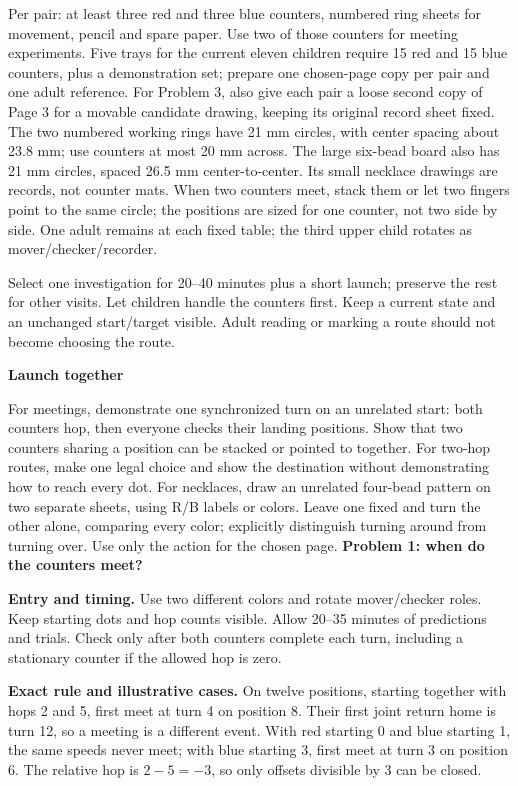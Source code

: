 \documentclass[11pt]{article}
\newcommand\lead[1]{\textbf{#1}\par}
\begin{document}
Per pair: at least three red and three blue counters, numbered ring sheets for movement, pencil and spare paper. Use two of those counters for meeting experiments. Five trays for the current eleven children require 15 red and 15 blue counters, plus a demonstration set; prepare one chosen-page copy per pair and one adult reference. For Problem 3, also give each pair a loose second copy of Page 3 for a movable candidate drawing, keeping its original record sheet fixed. The two numbered working rings have 21 mm circles, with center spacing about 23.8 mm; use counters at most 20 mm across. The large six-bead board also has 21 mm circles, spaced 26.5 mm center-to-center. Its small necklace drawings are records, not counter mats. When two counters meet, stack them or let two fingers point to the same circle; the positions are sized for one counter, not two side by side. One adult remains at each fixed table; the third upper child rotates as mover/checker/recorder.

Select one investigation for 20--40 minutes plus a short launch; preserve the rest for other visits. Let children handle the counters first. Keep a current state and an unchanged start/target visible. Adult reading or marking a route should not become choosing the route.

\lead{Launch together}
For meetings, demonstrate one synchronized turn on an unrelated start: both counters hop, then everyone checks their landing positions. Show that two counters sharing a position can be stacked or pointed to together. For two-hop routes, make one legal choice and show the destination without demonstrating how to reach every dot. For necklaces, draw an unrelated four-bead pattern on two separate sheets, using R/B labels or colors. Leave one fixed and turn the other alone, comparing every color; explicitly distinguish turning around from turning over. Use only the action for the chosen page.
\newpage
\lead{Problem 1: when do the counters meet?}
\textbf{Entry and timing.} Use two different colors and rotate mover/checker roles. Keep starting dots and hop counts visible. Allow 20--35 minutes of predictions and trials. Check only after both counters complete each turn, including a stationary counter if the allowed hop is zero.

\textbf{Exact rule and illustrative cases.} On twelve positions, starting together with hops 2 and 5, first meet at turn 4 on position 8. Their first joint return home is turn 12, so a meeting is a different event. With red starting 0 and blue starting 1, the same speeds never meet; with blue starting 3, first meet at turn 3 on position 6. The relative hop is $2-5=-3$, so only offsets divisible by 3 can be closed.
\end{document}
